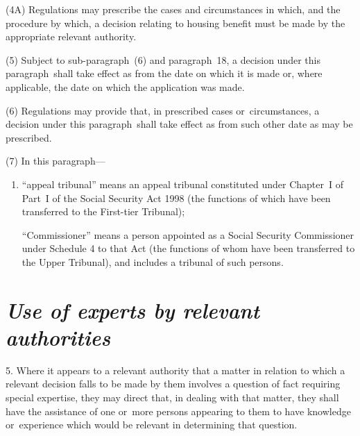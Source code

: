 \documentclass[12pt,a4paper]{article}
\begin{document}
(4A) Regulations may prescribe the cases and circumstances in which, and the procedure by which, a decision relating to housing benefit must be made by the appropriate relevant authority.

(5) Subject to sub-paragraph~(6)  and paragraph~18, a decision under this paragraph~shall take effect as from the date on which it is made or, where applicable, the date on which the application was made.

(6) Regulations may provide that, in prescribed cases or~circumstances, a decision under this paragraph~shall take effect as from such other date as may be prescribed.

(7) In this paragraph—
\begin{enumerate}\item[]
    “appeal tribunal” means an appeal tribunal constituted under Chapter~I of Part~I of the Social Security Act 1998 (the functions of which have been transferred to the First-tier Tribunal);

    “Commissioner” means a person appointed as a Social Security Commissioner under Schedule 4 to that Act (the functions of whom have been transferred to the Upper Tribunal), and includes a tribunal of such persons.
\end{enumerate}


\section*{\itshape Use of experts by relevant authorities}

5. Where it appears to a relevant authority that a matter in relation to which a relevant decision falls to be made by them involves a question of fact requiring special expertise, they may direct that, in dealing with that matter, they shall have the assistance of one or~more persons appearing to them to have knowledge or~experience which would be relevant in determining that question.
\end{document}
